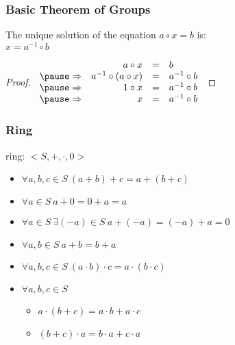\documentclass[dvipsnames]{beamer}
\begin{document}
\begin{frame}
  \frametitle{Basic Theorem of Groups}

  \begin{theorem}
    The unique solution of the equation $a \circ x = b$ is:\\
    $x = a^{-1} \circ b$
  \end{theorem}

  \pause
  \begin{proof}
    $\begin{array}{crcl}
                & a \circ x                & = & b\\\pause
    \Rightarrow & a^{-1} \circ (a \circ x) & = & a^{-1} \circ b\\\pause
    \Rightarrow & 1 \circ x                & = & a^{-1} \circ b\\\pause
    \Rightarrow & x                        & = & a^{-1} \circ b
    \end{array}$
  \end{proof}
\end{frame}

\begin{frame}
  \frametitle{Ring}

  \begin{definition}
    \alert{ring}: $<S,+,\cdot,0>$

    \begin{itemize}
      \item $\forall a,b,c \in S~(a + b) + c = a + (b + c)$
      \item $\forall a \in S~a + 0 = 0 + a = a$
      \item $\forall a \in S~\exists (-a) \in S~a + (-a) = (-a) + a = 0$
      \item $\forall a,b \in S~a + b = b + a$

      \pause
      \item $\forall a,b,c \in S~(a \cdot b) \cdot c = a \cdot (b \cdot c)$

      \pause
      \item $\forall a,b,c \in S$
      \begin{itemize}
        \item $a \cdot (b + c) = a \cdot b + a \cdot c$
        \item $(b + c) \cdot a = b \cdot a + c \cdot a$
      \end{itemize}
    \end{itemize}
  \end{definition}
\end{frame}
\end{document}
